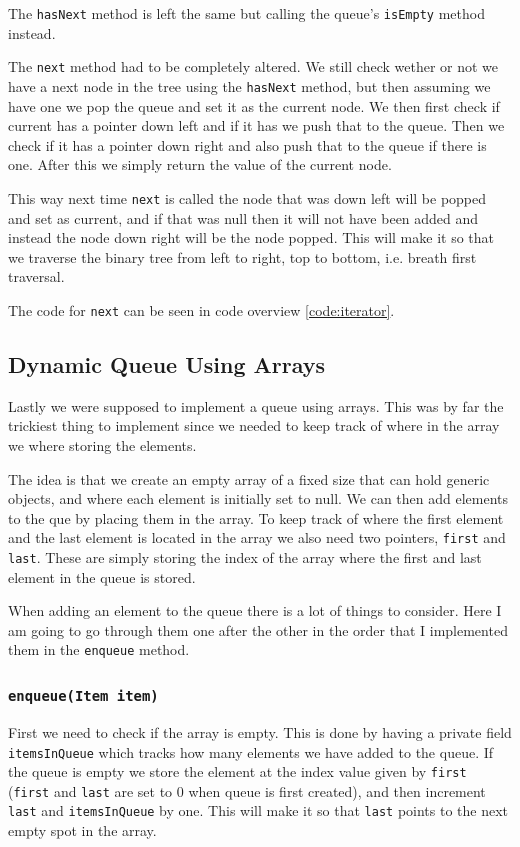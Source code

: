 \documentclass[a4paper,11pt]{article}
\begin{document}
The {\tt hasNext} method is left the same but calling the queue's {\tt isEmpty} method instead.

The {\tt next} method had to be completely altered. We still check wether or not we have a next node in the tree using the {\tt hasNext} method, but
then assuming we have one we pop the queue and set it as the current node. We then first check if current has a pointer down left and if it has we push that to
the queue. Then we check if it has a pointer down right and also push that to the queue if there is one. After this we simply return the value of the current node.

This way next time {\tt next} is called the node that was down left will be popped and set as current, and if that was null then it will not have been added and
instead the node down right will be the node popped. This will make it so that we traverse the binary tree from left to right, top to bottom, i.e. breath first
traversal.

The code for {\tt next} can be seen in code overview \ref{code:iterator}.
\subsection{Dynamic Queue Using Arrays}
Lastly we were supposed to implement a queue using arrays. This was by far the trickiest thing to implement since
we needed to keep track of where in the array we where storing the elements.

The idea is that we create an empty array of a fixed size that can hold generic objects, and where each element is
initially set to null. We can then add elements to the que by placing them in the array. To keep track of where the first
element and the last element is located in the array we also need two pointers, {\tt first} and {\tt last}. These are
simply storing the index of the array where the first and last element in the queue is stored.

When adding an element to the queue there is a lot of things to consider. Here I am going to go through them one after
the other in the order that I implemented them in the {\tt enqueue} method.

\subsubsection{{\tt enqueue(Item item)}}
First we need to check if the array is empty. This is done by having a private field {\tt itemsInQueue} which tracks
how many elements we have added to the queue. If the queue is empty we store the element at the index value given
by {\tt first} ({\tt first} and {\tt last} are set to 0 when queue is first created), and then increment {\tt last}
and {\tt itemsInQueue} by one. This will make it so that {\tt last} points to the next empty spot in the array.
\end{document}
